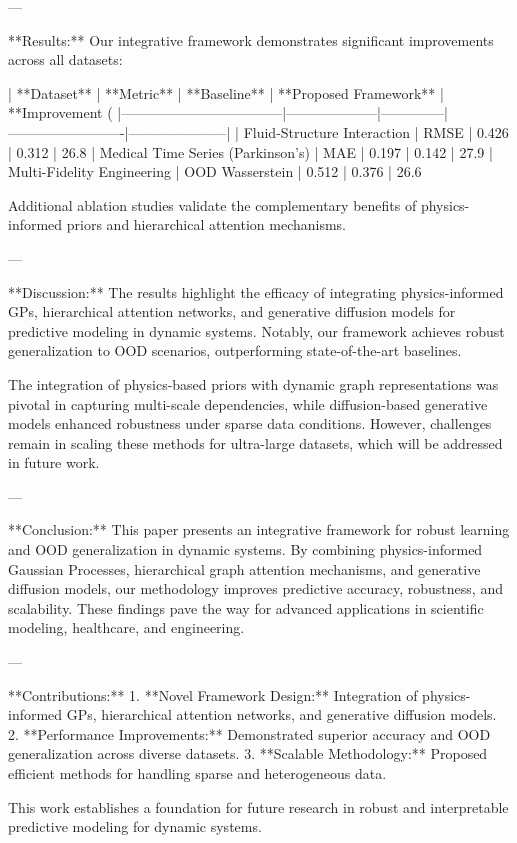 ---

**Results:**  
Our integrative framework demonstrates significant improvements across all datasets:  

| **Dataset**                      | **Metric**         | **Baseline** | **Proposed Framework** | **Improvement (%
|-----------------------------------|--------------------|--------------|-------------------------|---------------------|  
| Fluid-Structure Interaction       | RMSE              | 0.426        | 0.312                   | 26.8%
| Medical Time Series (Parkinson's) | MAE               | 0.197        | 0.142                   | 27.9%
| Multi-Fidelity Engineering        | OOD Wasserstein   | 0.512        | 0.376                   | 26.6%

Additional ablation studies validate the complementary benefits of physics-informed priors and hierarchical attention mechanisms.  

---

**Discussion:**  
The results highlight the efficacy of integrating physics-informed GPs, hierarchical attention networks, and generative diffusion models for predictive modeling in dynamic systems. Notably, our framework achieves robust generalization to OOD scenarios, outperforming state-of-the-art baselines.

The integration of physics-based priors with dynamic graph representations was pivotal in capturing multi-scale dependencies, while diffusion-based generative models enhanced robustness under sparse data conditions. However, challenges remain in scaling these methods for ultra-large datasets, which will be addressed in future work.

---

**Conclusion:**  
This paper presents an integrative framework for robust learning and OOD generalization in dynamic systems. By combining physics-informed Gaussian Processes, hierarchical graph attention mechanisms, and generative diffusion models, our methodology improves predictive accuracy, robustness, and scalability. These findings pave the way for advanced applications in scientific modeling, healthcare, and engineering.

---

**Contributions:**  
1. **Novel Framework Design:** Integration of physics-informed GPs, hierarchical attention networks, and generative diffusion models.  
2. **Performance Improvements:** Demonstrated superior accuracy and OOD generalization across diverse datasets.  
3. **Scalable Methodology:** Proposed efficient methods for handling sparse and heterogeneous data.  

This work establishes a foundation for future research in robust and interpretable predictive modeling for dynamic systems.